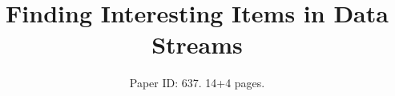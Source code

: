 \documentclass[sigconf, anonymous = true, screen = true, 10pt]{acmart}
\begin{document}
\title{Finding Interesting Items in Data Streams}

\author{
	Paper ID: 637. 14+4 pages.
}

\sloppy

	
	\maketitle
	
	
	
	
	

	
    			
				
                
				
				
	
	
	
	
	

    \clearpage	
	\vfill\eject
	{\scriptsize
	
	
		
%	
	}

    \clearpage		
	{
	\appendix
	
	
	}
	
\end{document}
